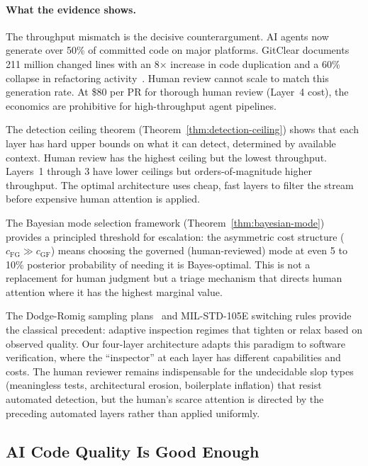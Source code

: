 \documentclass[11pt, a4paper]{googledeepmind}
\begin{document}
\paragraph{What the evidence shows.}
The throughput mismatch is the decisive counterargument. AI agents now generate over 50\% of committed code on major platforms. GitClear documents 211 million changed lines with an 8$\times$ increase in code duplication and a 60\% collapse in refactoring activity~\citep{gitclear2025}. Human review cannot scale to match this generation rate. At \$80 per PR for thorough human review (Layer~4 cost), the economics are prohibitive for high-throughput agent pipelines.

The detection ceiling theorem (Theorem~\ref{thm:detection-ceiling}) shows that each layer has hard upper bounds on what it can detect, determined by available context. Human review has the highest ceiling but the lowest throughput. Layers~1 through 3 have lower ceilings but orders-of-magnitude higher throughput. The optimal architecture uses cheap, fast layers to filter the stream before expensive human attention is applied.

The Bayesian mode selection framework (Theorem~\ref{thm:bayesian-mode}) provides a principled threshold for escalation: the asymmetric cost structure ($c_{\mathrm{FG}} \gg c_{\mathrm{GF}}$) means choosing the governed (human-reviewed) mode at even 5 to 10\% posterior probability of needing it is Bayes-optimal. This is not a replacement for human judgment but a triage mechanism that directs human attention where it has the highest marginal value.

The Dodge-Romig sampling plans~\citep{dodge1929method} and MIL-STD-105E switching rules provide the classical precedent: adaptive inspection regimes that tighten or relax based on observed quality. Our four-layer architecture adapts this paradigm to software verification, where the ``inspector'' at each layer has different capabilities and costs. The human reviewer remains indispensable for the undecidable slop types (meaningless tests, architectural erosion, boilerplate inflation) that resist automated detection, but the human's scarce attention is directed by the preceding automated layers rather than applied uniformly.


\subsection{AI Code Quality Is Good Enough}
\label{sec:contrarian-quality}
\end{document}
